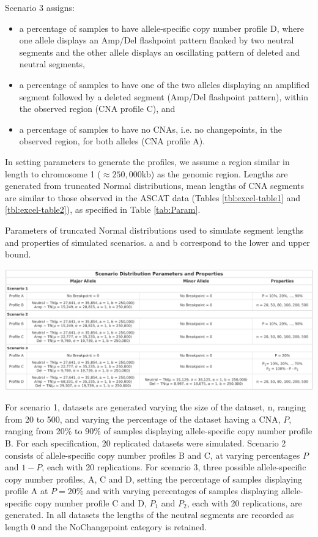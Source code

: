 Scenario 3 assigns:
\begin{itemize}
\item a percentage of samples to have allele-specific copy number profile D, where one allele displays an Amp/Del flashpoint pattern flanked by two neutral segments and the other allele displays an oscillating pattern of deleted and neutral segments,
\item a percentage of samples to have one of the two alleles displaying an amplified segment followed by a deleted segment (Amp/Del flashpoint pattern), within the observed region (CNA profile C), and 
\item a percentage of samples to have no CNAs, i.e. no changepoints, in the observed region, for both alleles (CNA profile A). 
\end{itemize}

In setting parameters to generate the profiles, we assume a region similar in length to chromosome 1 ($\approx 250,000$kb) as the genomic region. Lengths are generated from truncated Normal distributions, mean lengths of CNA segments are similar to those observed in the ASCAT data (Tables \ref{tbl:excel-table1} and \ref{tbl:excel-table2}), as specified in Table \ref{tab:Param}.

\begin{table}[!htb]
\vspace{0.5cm}
\center
\caption[Parameters of truncated Normal distributions used to simulate segment lengths and properties of simulated scenarios.]{Parameters of truncated Normal distributions used to simulate segment lengths and properties of simulated scenarios. a and b correspond to the lower and upper bound.}
\includegraphics[width = 1\textwidth]{../tables/Chapter_5/TN_Distribution.png}
\label{tab:Param}
\end{table}

For scenario 1, datasets are generated varying the size of the dataset, n, ranging from 20 to 500, and varying the percentage of the dataset having a CNA, $P$, ranging from 20\% to 90\% of samples displaying allele-specific copy number profile B. For each specification, 20 replicated datasets were simulated. Scenario 2 consists of allele-specific copy number profiles B and C, at varying percentages $P$ and $1-P$, each with 20 replications. For scenario 3, three possible allele-specific copy number profiles, A, C and D, setting the percentage of samples displaying profile A at $P = 20\%$ and with varying percentages of samples displaying allele-specific copy number profile C and D, $P_1$ and $P_2$, each with 20 replications, are generated. In all datasets the lengths of the neutral segments are recorded as length 0 and the NoChangepoint category is retained. 

